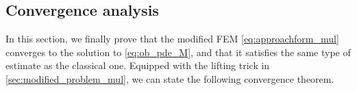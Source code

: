 
\subsection{Convergence analysis}
\label{sec:error_estimates_mul}

In this section, we finally prove that the modified FEM \eqref{eq:approachform_mul} converges to the solution to \eqref{eq:ob_pde_M},
and that it satisfies the same type of estimate as the classical one.
Equipped with the lifting trick in \cref{sec:modified_problem_mul},
we can state the following convergence theorem.

